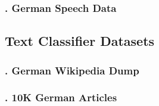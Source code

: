 \subsubsection{. German Speech Data \cite{radeck2015open}}
\label{meth:subsub3}



\subsection{Text Classifier Datasets}
\label{meth:sub2}

\subsubsection{. German Wikipedia Dump}
\label{meth:subsub4}
\subsubsection{. 10K German Articles}
\label{meth:subsub5}
